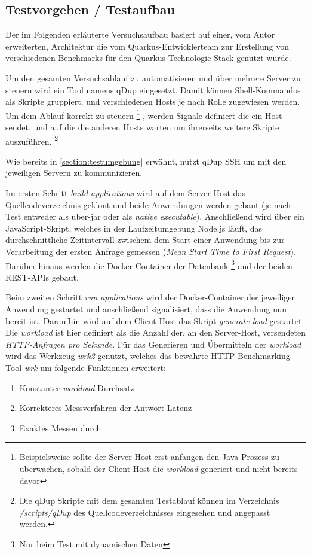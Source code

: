 \subsection{Testvorgehen / Testaufbau}
\label{section:vorgehen}
Der im Folgenden erläuterte Versuchsaufbau basiert auf einer, vom Autor erweiterten, Architektur die vom Quarkus-Entwicklerteam
zur Erstellung von verschiedenen Benchmarks für den Quarkus Technologie-Stack genutzt wurde.
\cite{QuarkusBlog, QuarkusJohnaohara}

Um den gesamten Versuchsablauf zu automatisieren und über mehrere Server zu steuern wird ein Tool namens qDup eingesetzt.
Damit können Shell-Kommandos als Skripte gruppiert, und verschiedenen Hosts je nach Rolle zugewiesen werden.
Um dem Ablauf korrekt zu steuern
\footnote{Beispielsweise sollte der Server-Host erst anfangen den Java-Prozess zu überwachen, sobald der Client-Host die \textit{workload}
    generiert und nicht bereits davor}
, werden Signale definiert die ein Host sendet, und auf die die anderen Hosts warten um ihrerseits
weitere Skripte auszuführen.
\footnote{Die qDup Skripte mit dem gesamten Testablauf können im Verzeichnis \textit{/scripts/qDup} des Quellcodeverzeichnisses eingesehen und
    angepasst werden.}

Wie bereits in \ref{section:testumgebung} erwähnt, nutzt qDup SSH um mit den jeweiligen Servern zu kommunizieren.

Im ersten Schritt \textit{build applications} wird auf dem Server-Host das Quellcodeverzeichnis geklont und beide Anwendungen werden gebaut
(je nach Test entweder als uber-jar oder als \textit{native executable}). Anschließend wird über ein JavaScript-Skript,
welches in der Laufzeitumgebung Node.js läuft, das durchschnittliche Zeitintervall zwischem dem Start einer Anwendung bis
zur Verarbeitung der ersten Anfrage gemessen
(\textit{Mean Start Time to First Request}). Darüber hinaus werden die Docker-Container der Datenbank
\footnote{Nur beim Test mit dynamischen Daten} und der beiden REST-APIs gebaut.

Beim zweiten Schritt \textit{run applications} wird der Docker-Container der jeweiligen Anwendung gestartet und anschließend signalisiert,
dass die Anwendung nun bereit ist.
Daraufhin wird auf dem Client-Host das Skript \textit{generate load} gestartet.
Die \textit{workload} ist hier definiert als die Anzahl der, an den Server-Host, versendeten \textit{HTTP-Anfragen pro Sekunde}.
Für das Generieren und Übermitteln der \textit{workload} wird das Werkzeug \textit{wrk2} genutzt, welches das
bewährte HTTP-Benchmarking Tool \textit{wrk} um folgende Funktionen erweitert:
\begin{enumerate}
    \item Konstanter \textit{workload} Durchsatz
    \item Korrekteres Messverfahren der Antwort-Latenz
    \item Exaktes Messen durch 
\end{enumerate}\cite{Wrk2, Wrk}

